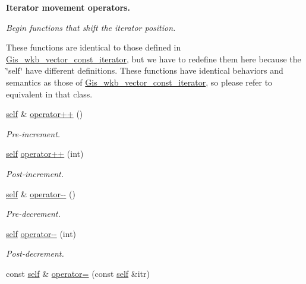 \begin{Indent}\textbf{ Iterator movement operators.}\par
{\em Begin functions that shift the iterator position.

These functions are identical to those defined in \mbox{\hyperlink{classGis__wkb__vector__const__iterator}{Gis\+\_\+wkb\+\_\+vector\+\_\+const\+\_\+iterator}}, but we have to redefine them here because the \char`\"{}self\char`\"{} have different definitions. These functions have identical behaviors and semantics as those of \mbox{\hyperlink{classGis__wkb__vector__const__iterator}{Gis\+\_\+wkb\+\_\+vector\+\_\+const\+\_\+iterator}}, so please refer to equivalent in that class. }\begin{DoxyCompactItemize}
\item 
\mbox{\hyperlink{classGis__wkb__vector__const__iterator}{self}} \& \mbox{\hyperlink{classGis__wkb__vector__iterator_aed302f00b9144114462cdb2600521130}{operator++}} ()
\begin{DoxyCompactList}\small\item\em Pre-\/increment. \end{DoxyCompactList}\item 
\mbox{\hyperlink{classGis__wkb__vector__const__iterator}{self}} \mbox{\hyperlink{classGis__wkb__vector__iterator_a8df0e51b19a7d8678d70f70f325abb75}{operator++}} (int)
\begin{DoxyCompactList}\small\item\em Post-\/increment. \end{DoxyCompactList}\item 
\mbox{\hyperlink{classGis__wkb__vector__const__iterator}{self}} \& \mbox{\hyperlink{classGis__wkb__vector__iterator_a919bc700a65a40d88627aec4c9172234}{operator-\/-\/}} ()
\begin{DoxyCompactList}\small\item\em Pre-\/decrement. \end{DoxyCompactList}\item 
\mbox{\hyperlink{classGis__wkb__vector__const__iterator}{self}} \mbox{\hyperlink{classGis__wkb__vector__iterator_ad0cb8606fa53e61247e5d18254373844}{operator-\/-\/}} (int)
\begin{DoxyCompactList}\small\item\em Post-\/decrement. \end{DoxyCompactList}\item 
const \mbox{\hyperlink{classGis__wkb__vector__const__iterator}{self}} \& \mbox{\hyperlink{classGis__wkb__vector__iterator_a48929642421f30c99ca89791121de93a}{operator=}} (const \mbox{\hyperlink{classGis__wkb__vector__const__iterator}{self}} \&itr)

\end{DoxyCompactItemize}
\end{Indent}
